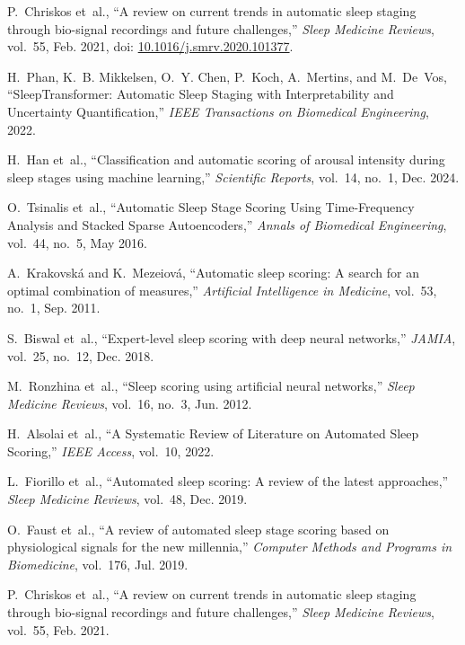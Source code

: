 \begin{thebibliography}{99}
	P.~Chriskos et~al., ``A review on current trends in automatic sleep staging through bio-signal recordings and future challenges,'' \emph{Sleep Medicine Reviews}, vol.~55, Feb. 2021, doi: \href{https://doi.org/10.1016/j.smrv.2020.101377}{10.1016/j.smrv.2020.101377}.
	
	H.~Phan, K.~B. Mikkelsen, O.~Y. Chen, P.~Koch, A.~Mertins, and M.~De~Vos, ``SleepTransformer: Automatic Sleep Staging with Interpretability and Uncertainty Quantification,'' \emph{IEEE Transactions on Biomedical Engineering}, 2022.
	
	

	
	H.~Han et~al., ``Classification and automatic scoring of arousal intensity during sleep stages using machine learning,'' \emph{Scientific Reports}, vol.~14, no.~1, Dec. 2024.
	
	O.~Tsinalis et~al., ``Automatic Sleep Stage Scoring Using Time-Frequency Analysis and Stacked Sparse Autoencoders,'' \emph{Annals of Biomedical Engineering}, vol.~44, no.~5, May 2016.
	
	A.~Krakovská and K.~Mezeiová, ``Automatic sleep scoring: A search for an optimal combination of measures,'' \emph{Artificial Intelligence in Medicine}, vol.~53, no.~1, Sep. 2011.
	
	S.~Biswal et~al., ``Expert-level sleep scoring with deep neural networks,'' \emph{JAMIA}, vol.~25, no.~12, Dec. 2018.
	
	M.~Ronzhina et~al., ``Sleep scoring using artificial neural networks,'' \emph{Sleep Medicine Reviews}, vol.~16, no.~3, Jun. 2012.
	
	H.~Alsolai et~al., ``A Systematic Review of Literature on Automated Sleep Scoring,'' \emph{IEEE Access}, vol.~10, 2022.
	
	L.~Fiorillo et~al., ``Automated sleep scoring: A review of the latest approaches,'' \emph{Sleep Medicine Reviews}, vol.~48, Dec. 2019.
	
	O.~Faust et~al., ``A review of automated sleep stage scoring based on physiological signals for the new millennia,'' \emph{Computer Methods and Programs in Biomedicine}, vol.~176, Jul. 2019.
	
	P.~Chriskos et~al., ``A review on current trends in automatic sleep staging through bio-signal recordings and future challenges,'' \emph{Sleep Medicine Reviews}, vol.~55, Feb. 2021.
	

\end{thebibliography}
